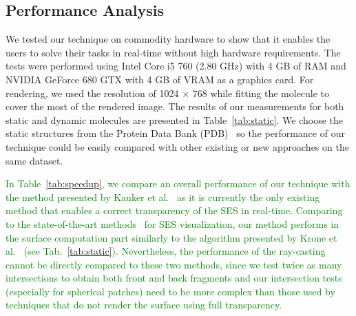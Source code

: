 \subsection{Performance Analysis}
\label{sec:performance}

We tested our technique on commodity hardware to show that it enables the users to solve their tasks in real-time without high hardware requirements.
The tests were performed using Intel Core i5 760 (2.80 GHz) with 4 GB of RAM and NVIDIA GeForce 680 GTX with 4 GB of VRAM as a graphics card.
For rendering, we used the resolution of 1024 $\times$ 768 while fitting the molecule to cover the most of the rendered image.
The results of our measurements for both static and dynamic molecules are presented in Table~\ref{tab:static}.
We choose the static structures from the Protein Data Bank (PDB)~\cite{sussman1998protein} so the performance of our technique could be easily compared with other existing or new approaches on the same dataset.

\textcolor{green}{
In Table~\ref{tab:speedup}, we compare an overall performance of our technique with the method presented by Kauker et al.~\cite{kauker2013rendering} as it is currently the only existing method that enables a correct transparency of the SES in real-time.
Comparing to the state-of-the-art methods~\cite{lindow2010accelerated,krone2011parallel} for SES visualization, our method performs in the surface computation part similarly to the algorithm presented by Krone et al.~\cite{krone2011parallel} (see Tab.~\ref{tab:static}).
Nevertheless, the performance of the ray-casting cannot be directly compared to these two methods, since
we test twice as many intersections to obtain both front and back fragments and our intersection tests (especially for spherical patches) need to be more complex than those used by techniques that do not render the surface using full transparency.
}

\setlength{\tabcolsep}{4.5pt}

